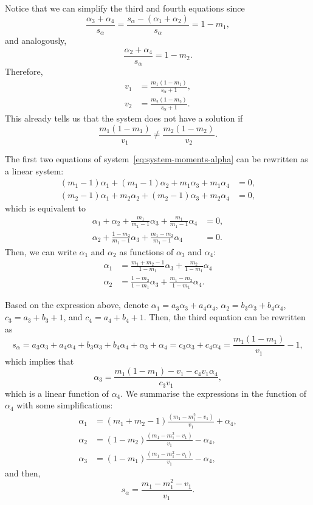 \documentclass[a4paper, notitlepage, 10pt]{article}
\theoremstyle{definition}
\begin{document}
\begin{proofEnd}
    Notice that we can simplify the third and fourth equations since 
    \[
    \frac{\alpha_3 + \alpha_4}{s_{\alpha}} = \frac{s_{\alpha} - (\alpha_1 + \alpha_2)}{s_{\alpha}} = 1 - m_1, 
    \]
    and analogously, 
    \[
    \frac{\alpha_2 + \alpha_4}{s_{\alpha}} = 1 - m_2. 
    \]
    Therefore, 
    \begin{align*}
        v_1 &= \frac{m_1(1 - m_1)}{s_{\alpha} + 1}, \\
        v_2 &= \frac{m_2(1 - m_2)}{s_{\alpha} + 1}.
    \end{align*}
    This already tells us that the system does not have a solution if 
    \[
    \frac{m_1(1-m_1)}{v_1} \neq \frac{m_2(1-m_2)}{v_2}. 
    \]
    
    The first two equations of system~\eqref{eq:system-moments-alpha} can be rewritten as a linear system:
    \begin{align*}
      (m_1 - 1)\alpha_1 + (m_1 - 1)\alpha_2 + m_1\alpha_3 + m_1\alpha_4 &= 0, \\
      (m_2 - 1)\alpha_1 + m_2\alpha_2 + (m_2-1)\alpha_3 + m_2\alpha_4 &= 0,
    \end{align*}
    which is equivalent to 
    \begin{align*}
      \alpha_1 + \alpha_2 + \frac{m_1}{m_1-1}\alpha_3 + \frac{m_1}{m_1-1}\alpha_4 &= 0, \\
      \alpha_2 + \frac{1-m_2}{m_1-1}\alpha_3 + \frac{m_1-m_2}{m_1-1}\alpha_4 &= 0.
    \end{align*}
    Then, we can write $\alpha_1$ and $\alpha_2$ as functions of $\alpha_3$ and $\alpha_4$:
    \begin{align*}
      \alpha_1 &= \frac{m_1+m_2-1}{1-m_1}\alpha_3 + \frac{m_2}{1-m_1}\alpha_4 \\
      \alpha_2 &= \frac{1-m_2}{1-m_1}\alpha_3 + \frac{m_1-m_2}{1-m_1}\alpha_4.
    \end{align*}

    Based on the expression above, denote $\alpha_1 = a_3\alpha_3 + a_4\alpha_4$, $\alpha_2 = b_3\alpha_3 + b_4\alpha_4$, $c_3 = a_3 + b_3 + 1$, and $c_4 = a_4 + b_4 + 1$. 
    Then, the third equation can be rewritten as 
    \[
    s_{\alpha} = a_3\alpha_3 + a_4\alpha_4 + b_3\alpha_3 + b_4\alpha_4 + \alpha_3 + \alpha_4 = c_3\alpha_3 + c_4 \alpha_4 = \frac{m_1(1-m_1)}{v_1} - 1, 
    \]
    which implies that 
    \[
    \alpha_3 = \frac{m_1(1-m_1) - v_1 - c_4v_1\alpha_4}{c_3v_1},
    \]
    which is a linear function of $\alpha_4$. 
    We summarise the expressions in the function of $\alpha_4$ with some simplifications: 
    \begin{align*}
      \alpha_1 &= (m_1 + m_2 - 1)\frac{(m_1 - m_1^2 - v_1)}{v_1} + \alpha_4, \\
      \alpha_2 &=  (1 - m_2)\frac{(m_1 - m_1^2 - v_1)}{v_1} - \alpha_4, \\
      \alpha_3 &= (1-m_1)\frac{(m_1 - m_1^2 - v_1)}{v_1} - \alpha_4,
    \end{align*}
    and then,
    \[
    s_{\alpha} = \frac{m_1 - m_1^2 - v_1}{v_1}.
    \]


\end{proofEnd}
\end{document}
